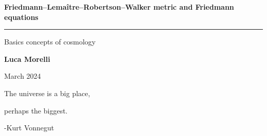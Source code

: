 \begin{titlepage}
	\vspace*{5cm}
	\begin{center}
	\huge \textbf{Friedmann–Lemaître–Robertson–Walker metric and Friedmann equations}
	
	\rule{7cm}{0.4pt} 
	
	\LARGE Basics concepts of cosmology
	
	\vspace{40pt}
	
	\LARGE \textbf{Luca Morelli}
	
	\vspace{20pt}
	
	\LARGE March 2024
	
	\end{center}
   
   \vspace{200pt}
   
    \begin{flushright}
    	The universe is a big place, 

		perhaps the biggest.

        -Kurt Vonnegut
    \end{flushright}	
\end{titlepage}